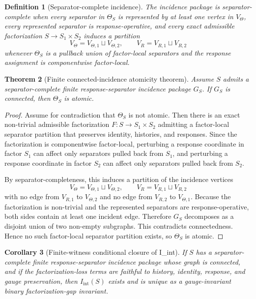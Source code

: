 \documentclass[11pt]{article}
\newtheorem{definition}{Definition}[section]
\newtheorem{theorem}[definition]{Theorem}
\newtheorem{corollary}[definition]{Corollary}
\newcommand{\Iint}{I_{\mathrm{int}}}
\begin{document}
\begin{definition}[Separator-complete incidence]
The incidence package is separator-complete when every separator in $\Theta_S$ is represented by at least one vertex in $V_\Theta$, every represented separator is response-operative, and every exact admissible factorization $S\to S_1\times S_2$ induces a partition
\[
  V_\Theta=V_{\Theta,1}\sqcup V_{\Theta,2},\qquad V_R=V_{R,1}\sqcup V_{R,2}
\]
whenever $\Theta_S$ is a pullback union of factor-local separators and the response assignment is componentwise factor-local.
\end{definition}

\begin{theorem}[Finite connected-incidence atomicity theorem]
Assume $S$ admits a separator-complete finite response-separator incidence package $G_S$. If $G_S$ is connected, then $\Theta_S$ is atomic.
\end{theorem}

\begin{proof}
Assume for contradiction that $\Theta_S$ is not atomic. Then there is an exact non-trivial admissible factorization $F:S\to S_1\times S_2$ admitting a factor-local separator partition that preserves identity, histories, and responses. Since the factorization is componentwise factor-local, perturbing a response coordinate in factor $S_1$ can affect only separators pulled back from $S_1$, and perturbing a response coordinate in factor $S_2$ can affect only separators pulled back from $S_2$.

By separator-completeness, this induces a partition of the incidence vertices
\[
  V_\Theta=V_{\Theta,1}\sqcup V_{\Theta,2},\qquad V_R=V_{R,1}\sqcup V_{R,2}
\]
with no edge from $V_{R,1}$ to $V_{\Theta,2}$ and no edge from $V_{R,2}$ to $V_{\Theta,1}$. Because the factorization is non-trivial and the represented separators are response-operative, both sides contain at least one incident edge. Therefore $G_S$ decomposes as a disjoint union of two non-empty subgraphs. This contradicts connectedness. Hence no such factor-local separator partition exists, so $\Theta_S$ is atomic.
\end{proof}

\begin{corollary}[Finite-witness conditional closure of I\_int]
If $S$ has a separator-complete finite response-separator incidence package whose graph is connected, and if the factorization-loss terms are faithful to history, identity, response, and gauge preservation, then $\Iint(S)$ exists and is unique as a gauge-invariant binary factorization-gap invariant.
\end{corollary}
\end{document}
